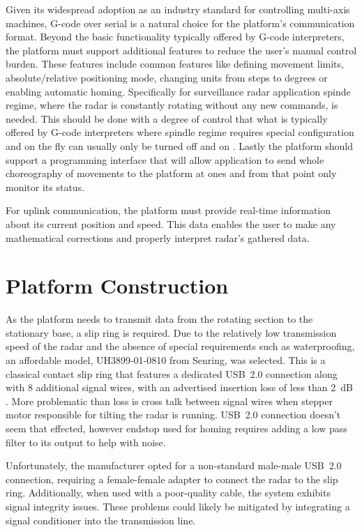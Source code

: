 Given its widespread adoption as an industry standard for controlling multi-axis machines, G-code over serial is a natural choice for the platform's communication format.
Beyond the basic functionality typically offered by G-code interpreters, the platform must support additional features to reduce the user's manual control burden.
These features include common features like defining movement limits, absolute/relative positioning mode, changing units from steps to degrees or enabling automatic homing.
Specifically for  surveillance radar application spinde regime, where the radar is constantly rotating without any new commands, is needed.
This should be done with a degree of control that what is typically offered by G-code interpreters where spindle regime requires special configuration  and on the fly can usually only be turned off and on \cite{duet}.
Lastly the platform should support a programming interface that will allow application to send whole choreography of movements to the platform at ones and from that point only monitor its status.

For uplink communication, the platform must provide real-time information about its current position and speed.
This data enables the user to make any mathematical corrections and properly interpret radar's gathered data.


\section{Platform Construction}

As the platform needs to transmit data from the rotating section to the stationary base, a slip ring is required.
Due to the relatively low transmission speed of the radar and the absence of special requirements such as waterproofing, an affordable model, UH3899-01-0810 from Senring, was selected.
This is a classical contact slip ring that features a dedicated USB~2.0 connection along with 8 additional signal wires, with an advertised insertion loss of less than 2~dB \cite{slipring}.
More problematic than loss is cross talk between signal wires when stepper motor responsible for tilting the radar is running.
USB~2.0 connection doesn't seem that effected, however endstop used for homing requires adding a low pass filter to its output to help with noise.

Unfortunately, the manufacturer opted for a non-standard male-male USB~2.0 connection, requiring a female-female adapter to connect the radar to the slip ring.
Additionally, when used with a poor-quality cable, the system exhibits signal integrity issues.
These problems could likely be mitigated by integrating a signal conditioner into the transmission line.

